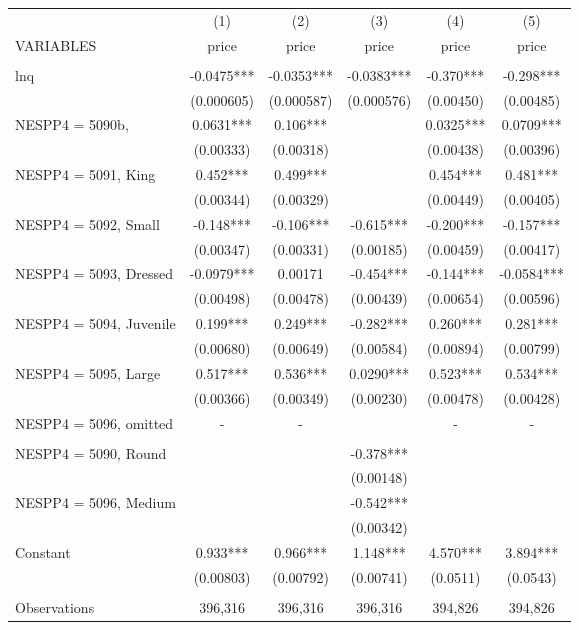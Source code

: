 \begin{tabular}{lccccc} \hline
 & (1) & (2) & (3) & (4) & (5) \\
VARIABLES & price & price & price & price & price \\ \hline
 &  &  &  &  &  \\
lnq & -0.0475*** & -0.0353*** & -0.0383*** & -0.370*** & -0.298*** \\
 & (0.000605) & (0.000587) & (0.000576) & (0.00450) & (0.00485) \\
NESPP4 = 5090b, & 0.0631*** & 0.106*** &  & 0.0325*** & 0.0709*** \\
 & (0.00333) & (0.00318) &  & (0.00438) & (0.00396) \\
NESPP4 = 5091, King & 0.452*** & 0.499*** &  & 0.454*** & 0.481*** \\
 & (0.00344) & (0.00329) &  & (0.00449) & (0.00405) \\
NESPP4 = 5092, Small & -0.148*** & -0.106*** & -0.615*** & -0.200*** & -0.157*** \\
 & (0.00347) & (0.00331) & (0.00185) & (0.00459) & (0.00417) \\
NESPP4 = 5093, Dressed & -0.0979*** & 0.00171 & -0.454*** & -0.144*** & -0.0584*** \\
 & (0.00498) & (0.00478) & (0.00439) & (0.00654) & (0.00596) \\
NESPP4 = 5094, Juvenile & 0.199*** & 0.249*** & -0.282*** & 0.260*** & 0.281*** \\
 & (0.00680) & (0.00649) & (0.00584) & (0.00894) & (0.00799) \\
NESPP4 = 5095, Large & 0.517*** & 0.536*** & 0.0290*** & 0.523*** & 0.534*** \\
 & (0.00366) & (0.00349) & (0.00230) & (0.00478) & (0.00428) \\
NESPP4 = 5096, omitted & - & - &  & - & - \\
 &  &  &  &  &  \\
NESPP4 = 5090, Round &  &  & -0.378*** &  &  \\
 &  &  & (0.00148) &  &  \\
NESPP4 = 5096, Medium &  &  & -0.542*** &  &  \\
 &  &  & (0.00342) &  &  \\
Constant & 0.933*** & 0.966*** & 1.148*** & 4.570*** & 3.894*** \\
 & (0.00803) & (0.00792) & (0.00741) & (0.0511) & (0.0543) \\
 &  &  &  &  &  \\
Observations & 396,316 & 396,316 & 396,316 & 394,826 & 394,826 \\

\end{tabular}
